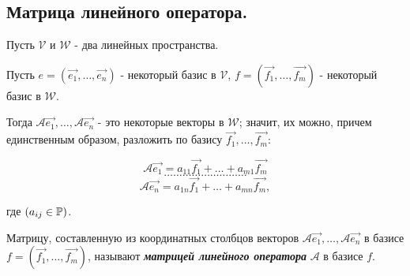 \subsection{
    Матрица линейного оператора.
}

Пусть $\mathcal{V}$ и $\mathcal{W}$ - два линейных пространства.

Пусть $e = (\vec{e_1}, \ldots, \vec{e_n})$ - некоторый базис в $\mathcal{V}$, $f = (\vec{f_1}, \ldots, \vec{f_m})$ - некоторый базис в $\mathcal{W}$. 

Тогда $\mathscr{A}\vec{e_1}, \ldots, \mathscr{A}\vec{e_n}$ - это некоторые векторы в $\mathcal{W}$; значит, их можно, причем единственным образом, разложить по базису $\vec{f_1}, \ldots, \vec{f_m}$:

$$\mathscr{A}\vec{e_1} = a_{11}\vec{f_1} + \ldots + a_{m1}\vec{f_m}$$
$$\ldots \ldots \ldots \ldots \ldots \ldots \ldots \ldots \ldots$$
$$\mathscr{A}\vec{e_n} = a_{1n}\vec{f_1} + \ldots + a_{mn}\vec{f_m},$$

где $(a_{ij} \in \mathbb{P})$.

\begin{definition}
    Матрицу, составленную из координатных столбцов векторов $\mathscr{A}\vec{e_1}, \ldots, \mathscr{A}\vec{e_n}$ в базисе $f = (\vec{f_1}, \ldots, \vec{f_m})$, называют \textit{\textbf{матрицей линейного оператора}} $\mathscr{A}$ в базисе $f$.
\end{definition}
